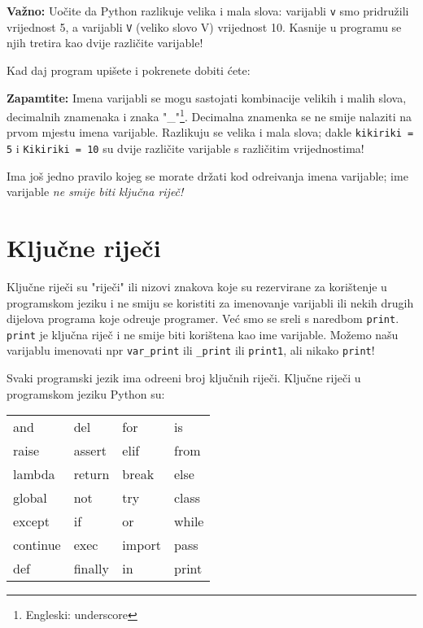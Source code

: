 	\textbf{Va\v{z}no:} Uo\v{c}ite da Python razlikuje velika i mala
	slova: varijabli \verb+v+ smo
	pridru\v{z}ili vrijednost 5, a varijabli \verb+V+ (veliko slovo V) vrijednost 10.
	Kasnije u programu se njih tretira kao dvije razli\v{c}ite varijable!

	Kad daj program upi\v{s}ete i pokrenete dobiti \'{c}ete:


	\textbf{Zapamtite:} Imena varijabli se mogu sastojati kombinacije velikih i malih
	slova, decimalnih znamenaka
	i znaka "\_"\footnote{Engleski: underscore}. Decimalna znamenka se ne smije
	nalaziti na prvom mjestu imena varijable. Razlikuju se velika i mala slova; dakle
	\verb+kikiriki = 5+ i \verb+Kikiriki = 10+ su dvije razli\v{c}ite varijable s
	razli\v{c}itim vrijednostima! 

	Ima jo\v{s} jedno pravilo kojeg se morate dr\v{z}ati kod odre\dj{}ivanja imena
	varijable; ime varijable \emph{ne smije biti klju\v{c}na rije\v{c}!}

\section{Klju\v{c}ne rije\v{c}i}

	Klju\v{c}ne rije\v{c}i su "rije\v{c}i" ili nizovi znakova koje su rezervirane za
	kori\v{s}tenje u programskom jeziku i ne smiju se koristiti za imenovanje varijabli
	ili nekih drugih dijelova programa koje odre\dj{}uje programer. Ve\'{c} smo se
	sreli s  naredbom \verb+print+. \verb+print+ je klju\v{c}na rije\v{c} i ne smije
	biti kori\v{s}tena kao ime varijable. Mo\v{z}emo na\v{s}u varijablu imenovati npr
	\verb+var_print+ ili \verb+_print+ ili \verb+print1+, ali nikako \verb+print+!

	Svaki programski jezik ima odre\dj{}eni broj klju\v{c}nih rije\v{c}i. Klju\v{c}ne
	rije\v{c}i u programskom jeziku Python su:

\begin{center}
\begin{tabular}{llll}
and & del & for & is \\
raise & assert & elif & from\\
lambda & return & break & else\\
global & not & try & class\\
except & if & or & while\\
continue & exec & import & pass\\
def & finally & in & print
\end{tabular}
\end{center}

